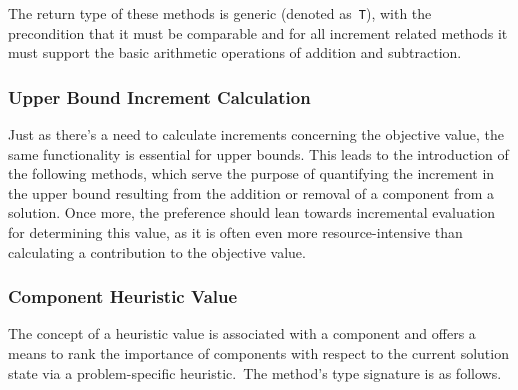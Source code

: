 \begin{center}

\end{center}

The return type of these methods is generic (denoted as~\texttt{T}), with the
precondition that it must be comparable and for all increment related methods it
must support the basic arithmetic operations of addition and subtraction.

\subsubsection*{Upper Bound Increment Calculation}

Just as there's a need to calculate increments concerning the objective value,
the same functionality is essential for upper bounds. This leads to the
introduction of the following methods, which serve the purpose of quantifying
the increment in the upper bound resulting from the addition or
removal of a component from a solution. Once more, the preference should lean
towards incremental evaluation for determining this value, as it is often even
more resource-intensive than calculating a contribution to the objective value.

\begin{center}

\end{center}

\subsubsection*{Component Heuristic Value}

The concept of a heuristic value is associated with a component and offers a
means to rank the importance of components with respect to the current solution
state via a problem-specific heuristic.~The method's type signature is as
follows.

\begin{center}
\end{center}

